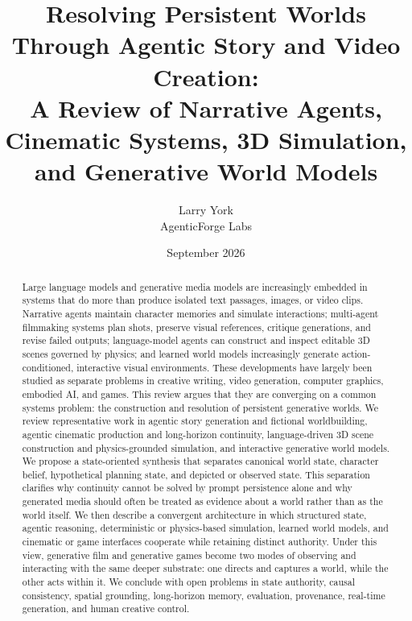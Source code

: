 \documentclass{article}
\title{Resolving Persistent Worlds Through Agentic Story and Video Creation:\\
A Review of Narrative Agents, Cinematic Systems, 3D Simulation, and Generative World Models}
\author{
Larry York \\
AgenticForge Labs
}
\date{September 2026}
\begin{document}
\maketitle

\begin{abstract}
Large language models and generative media models are increasingly embedded in systems that do more than produce isolated text passages, images, or video clips. Narrative agents maintain character memories and simulate interactions; multi-agent filmmaking systems plan shots, preserve visual references, critique generations, and revise failed outputs; language-model agents can construct and inspect editable 3D scenes governed by physics; and learned world models increasingly generate action-conditioned, interactive visual environments. These developments have largely been studied as separate problems in creative writing, video generation, computer graphics, embodied AI, and games. This review argues that they are converging on a common systems problem: the construction and resolution of persistent generative worlds. We review representative work in agentic story generation and fictional worldbuilding, agentic cinematic production and long-horizon continuity, language-driven 3D scene construction and physics-grounded simulation, and interactive generative world models. We propose a state-oriented synthesis that separates canonical world state, character belief, hypothetical planning state, and depicted or observed state. This separation clarifies why continuity cannot be solved by prompt persistence alone and why generated media should often be treated as evidence about a world rather than as the world itself. We then describe a convergent architecture in which structured state, agentic reasoning, deterministic or physics-based simulation, learned world models, and cinematic or game interfaces cooperate while retaining distinct authority. Under this view, generative film and generative games become two modes of observing and interacting with the same deeper substrate: one directs and captures a world, while the other acts within it. We conclude with open problems in state authority, causal consistency, spatial grounding, long-horizon memory, evaluation, provenance, real-time generation, and human creative control.
\end{abstract}

\end{document}
